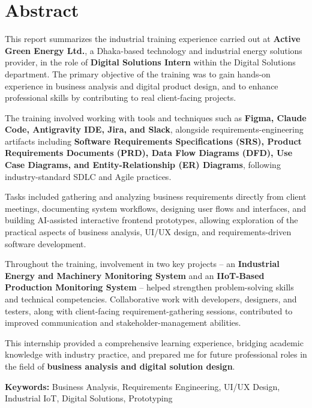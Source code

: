 \chapter*{\centering Abstract}

\par
This report summarizes the industrial training experience carried out at \textbf{Active Green Energy Ltd.}, a Dhaka-based technology and industrial energy solutions provider, in the role of \textbf{Digital Solutions Intern} within the Digital Solutions department. The primary objective of the training was to gain hands-on experience in business analysis and digital product design, and to enhance professional skills by contributing to real client-facing projects.

The training involved working with tools and techniques such as \textbf{Figma, Claude Code, Antigravity IDE, Jira, and Slack}, alongside requirements-engineering artifacts including \textbf{Software Requirements Specifications (SRS), Product Requirements Documents (PRD), Data Flow Diagrams (DFD), Use Case Diagrams, and Entity-Relationship (ER) Diagrams}, following industry-standard SDLC and Agile practices.

Tasks included gathering and analyzing business requirements directly from client meetings, documenting system workflows, designing user flows and interfaces, and building AI-assisted interactive frontend prototypes, allowing exploration of the practical aspects of business analysis, UI/UX design, and requirements-driven software development.

Throughout the training, involvement in two key projects -- an \textbf{Industrial Energy and Machinery Monitoring System} and an \textbf{IIoT-Based Production Monitoring System} -- helped strengthen problem-solving skills and technical competencies. Collaborative work with developers, designers, and testers, along with client-facing requirement-gathering sessions, contributed to improved communication and stakeholder-management abilities.

This internship provided a comprehensive learning experience, bridging academic knowledge with industry practice, and prepared me for future professional roles in the field of \textbf{business analysis and digital solution design}.

\vspace{0.5cm}

\noindent\textbf{Keywords:} Business Analysis, Requirements Engineering, UI/UX Design, Industrial IoT, Digital Solutions, Prototyping
